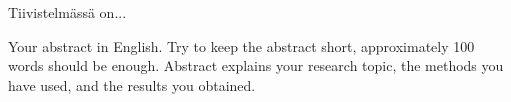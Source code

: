 
\begin{abstractpage}[finnish]
  Tiivistelmässä on... 
\end{abstractpage}

\newpage
%
\begin{abstractpage}[english]
Your abstract in English. Try to keep the abstract short, approximately 
 100 words should be enough. Abstract explains your research topic, 
 the methods you have used, and the results you obtained.  
\end{abstractpage}


